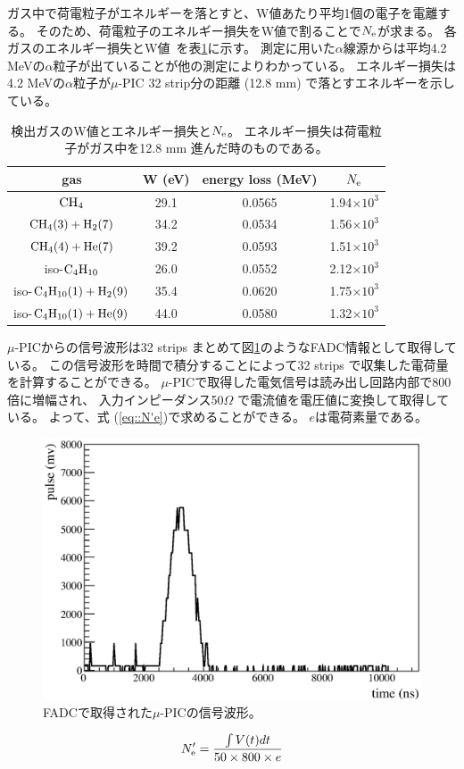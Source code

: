 ガス中で荷電粒子がエネルギーを落とすと、W値あたり平均1個の電子を電離する。
そのため、荷電粒子のエネルギー損失をW値で割ることで$N_{\rm e}$が求まる。
各ガスのエネルギー損失とW値~\cite{energy_per_ion_pair,pdg}を表\ref{tab::energy_loss_and_W_val}に示す。
測定に用いた$\alpha$線源からは平均4.2 MeVの$\alpha$粒子が出ていることが他の測定によりわかっている。
エネルギー損失は4.2 MeVの$\alpha$粒子が$\mu$-PIC 32 strip分の距離 (12.8 mm) で落とすエネルギーを示している。
\begin{table}
  \centering
  \caption[検出ガスのW値とエネルギー損失と$N_{\rm e}$。]
          {検出ガスのW値とエネルギー損失と$N_{\rm e}$。
          エネルギー損失は荷電粒子がガス中を12.8 mm 進んだ時のものである。}
  \label{tab::energy_loss_and_W_val}
  \begin{tabular}{cccc}
    \toprule
    gas & W (eV) & energy loss (MeV) & $N_{\rm e}$\\
    \midrule
    ${\rm CH_{4}}$                          & 29.1 & 0.0565 & 1.94$\times 10^{3}$ \\
    ${\rm CH_{4} (3) + H_{2} (7)}$          & 34.2 & 0.0534 & 1.56$\times 10^{3}$ \\
    ${\rm CH_{4} (4) + He (7)}$             & 39.2 & 0.0593 & 1.51$\times 10^{3}$ \\
    iso-${\rm C_{4}H_{10}}$                 & 26.0 & 0.0552 & 2.12$\times 10^{3}$ \\
    iso-${\rm C_{4}H_{10} (1) + H_{2} (9)}$ & 35.4 & 0.0620 & 1.75$\times 10^{3}$ \\
    iso-${\rm C_{4}H_{10} (1) + He (9)}$    & 44.0 & 0.0580 & 1.32$\times 10^{3}$ \\
    \bottomrule
  \end{tabular}
\end{table}

$\mu$-PICからの信号波形は32 strips まとめて図\ref{fig::FADC_waveform}のようなFADC情報として取得している。
この信号波形を時間で積分することによって32 strips で収集した電荷量を計算することができる。
$\mu$-PICで取得した電気信号は読み出し回路内部で800倍に増幅され、
入力インピーダンス50$\Omega$ で電流値を電圧値に変換して取得している。
よって、式 (\ref{eq::N'e})で求めることができる。
$e$は電荷素量である。
\begin{figure}
  \centering
  \includegraphics[clip, width=0.7\columnwidth]{eps/0101_waveform_8.eps}
  \caption{FADCで取得された$\mu$-PICの信号波形。}
  \label{fig::FADC_waveform}
\end{figure}
\begin{equation}
  N'_{\rm e} = \frac{\int V (t) dt}{ 50 \times 800 \times e}
  \label{eq::N'e}
\end{equation}

